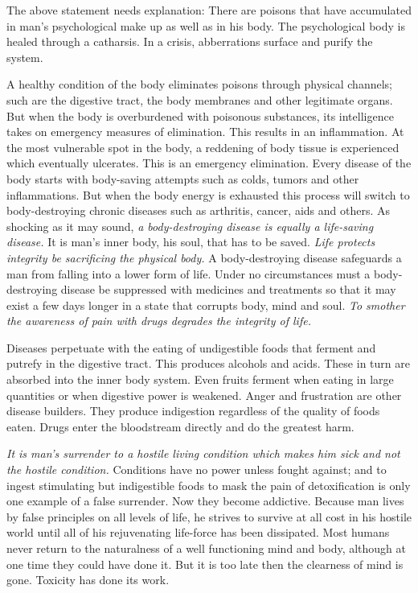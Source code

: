 \documentclass[12pt,letterpaper]{article}
\begin{document}
The above statement needs explanation: There are poisons that have
accumulated in man's psychological make up as well as in his body. The
psychological body is healed through a catharsis. In a crisis,
abberrations surface and purify the system.

A healthy condition of the body eliminates poisons through physical
channels; such are the digestive tract, the body membranes and other
legitimate organs. But when the body is overburdened with poisonous
substances, its intelligence takes on emergency measures of
elimination. This results in an inflammation. At the most vulnerable
spot in the body, a reddening of body tissue is experienced which
eventually ulcerates. This is an emergency elimination. Every disease
of the body starts with body-saving attempts such as colds, tumors and
other inflammations. But when the body energy is exhausted this
process will switch to body-destroying chronic diseases such as
arthritis, cancer, aids and others. As shocking as it may sound,
\emph{a body-destroying disease is equally a life-saving disease.} It
is man's inner body, his soul, that has to be saved. \emph{Life
protects integrity be sacrificing the physical body.} A
body-destroying disease safeguards a man from falling into a lower
form of life. Under no circumstances must a body-destroying disease be
suppressed with medicines and treatments so that it may exist a few
days longer in a state that corrupts body, mind and soul. \emph{To
smother the awareness of pain with drugs degrades the integrity of
life.}


Diseases perpetuate with the eating of undigestible foods that ferment
and putrefy in the digestive tract. This produces alcohols and
acids. These in turn are absorbed into the inner body system. Even
fruits ferment when eating in large quantities or when digestive power
is weakened. Anger and frustration are other disease builders. They
produce indigestion regardless of the quality of foods eaten. Drugs
enter the bloodstream directly and do the greatest harm.

\emph{It is man's surrender to a hostile living condition which makes
him sick and not the hostile condition.} Conditions have no power
unless fought against; and to ingest stimulating but indigestible
foods to mask the pain of detoxification is only one example of a
false surrender. Now they become addictive. Because man lives by false
principles on all levels of life, he strives to survive at all cost in
his hostile world until all of his rejuvenating life-force has been
dissipated. Most humans never return to the naturalness of a well
functioning mind and body, although at one time they could have done
it. But it is too late then the clearness of mind is gone. Toxicity
has done its work.
\end{document}
